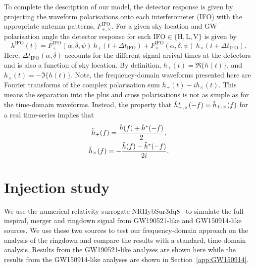 To complete the description of our model, the detector response is given by projecting the waveform polarisations onto each interferometer (IFO) with the appropriate antenna patterns, $F^\mathrm{IFO}_{+,\times}$.
For a given sky location and GW polarisation angle the detector response for each ${\mathrm{IFO}\in \{\mathrm{H}, \mathrm{L}, \mathrm{V} \}}$ is given by
\begin{equation} \label{eq:projection_antenna}
    h^\mathrm{IFO}(t) = F^\mathrm{IFO}_+(\alpha, \delta, \psi) ~ h_+(t + \Delta t_\mathrm{IFO}) + F^\mathrm{IFO}_\times(\alpha, \delta, \psi) ~ h_\times(t + \Delta t_\mathrm{IFO}).
\end{equation}
Here, $\Delta t_\mathrm{IFO}(\alpha, \delta)$ accounts for the different signal arrival times at the detectors and is also a function of sky location.
By definition, $h_+(t) = \Re\{ h(t) \}$, and $h_\times(t) = -\Im \{ h(t) \}$.
Note, the frequency-domain waveforms presented here are Fourier transforms of the complex polarisation sum $h_+(t) - ih_\times (t)$. This means the separation into the plus and cross polarisations is not as simple as for the time-domain waveforms. Instead, the property that $\Tilde{h}^*_{+,\times}(-f) = \Tilde{h}_{+,\times}(f)$ for a real time-series implies that
\begin{gather}
	\Tilde{h}_+(f) = \frac{\Tilde{h}(f) + \Tilde{h}^*(-f)}{2}, \\ 
	\Tilde{h}_\times(f) = -\frac{\Tilde{h}(f) - \Tilde{h}^*(-f)}{2i}.
\end{gather}


\section{Injection study}\label{sec:injection_study}

We use the numerical relativity surrogate NRHybSur3dq8~\cite{Varma:2018mmi} to simulate the full inspiral, merger and ringdown signal from GW190521-like and GW150914-like sources. 
We use these two sources to test our frequency-domain approach on the analysis of the ringdown and compare the results with a standard, time-domain analysis.
Results from the GW190521-like analyses are shown here while the results from the GW150914-like analyses are shown in Section~\ref{app:GW150914}.

